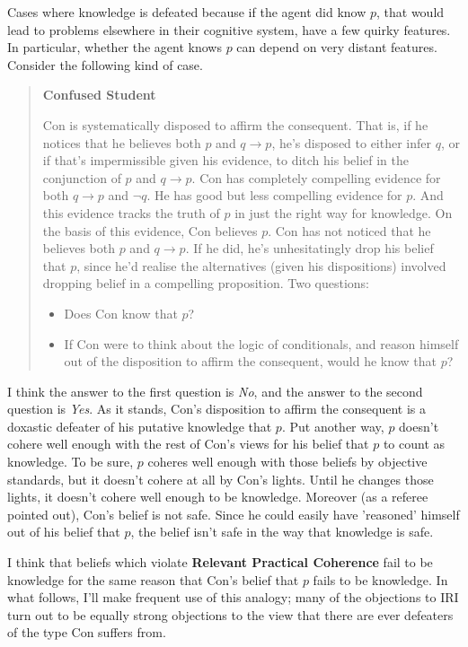 Cases where knowledge is defeated because if the agent did know $p$, that would lead to problems elsewhere in their cognitive system, have a few quirky features. In particular, whether the agent knows $p$ can depend on very distant features. Consider the following kind of case.

\begin{quote}

\textbf{Confused Student}

Con is systematically disposed to affirm the consequent. That is, if he notices that he believes both $p$ and $q \rightarrow p$, he's disposed to either infer $q$, or if that's impermissible given his evidence, to ditch his belief in the conjunction of $p$ and $q \rightarrow p$. Con has completely compelling evidence for both $q \rightarrow p$ and $\neg q$. He has good but less compelling evidence for $p$. And this evidence tracks the truth of $p$ in just the right way for knowledge. On the basis of this evidence, Con believes $p$. Con has not noticed that he believes both $p$ and $q \rightarrow p$. If he did, he's unhesitatingly drop his belief that $p$, since he'd realise the alternatives (given his dispositions) involved dropping belief in a compelling proposition. Two questions:
\begin{itemize}
\item Does Con know that $p$?
\item If Con were to think about the logic of conditionals, and reason himself out of the disposition to affirm the consequent, would he know that $p$?
\end{itemize}
\end{quote}

\noindent I think the answer to the first question is \textit{No}, and the answer to the second question is \textit{Yes}. As it stands, Con's disposition to affirm the consequent is a doxastic defeater of his putative knowledge that $p$. Put another way, $p$ doesn't cohere well enough with the rest of Con's views for his belief that $p$ to count as knowledge. To be sure, $p$ coheres well enough with those beliefs by objective standards, but it doesn't cohere at all by Con's lights. Until he changes those lights, it doesn't cohere well enough to be knowledge. Moreover (as a referee pointed out), Con's belief is not safe. Since he could easily have 'reasoned' himself out of his belief that $p$, the belief isn't safe in the way that knowledge is safe.

I think that beliefs which violate \textbf{Relevant Practical Coherence} fail to be knowledge for the same reason that Con's belief that $p$ fails to be knowledge. In what follows, I'll make frequent use of this analogy; many of the objections to IRI turn out to be equally strong objections to the view that there are ever defeaters of the type Con suffers from.


